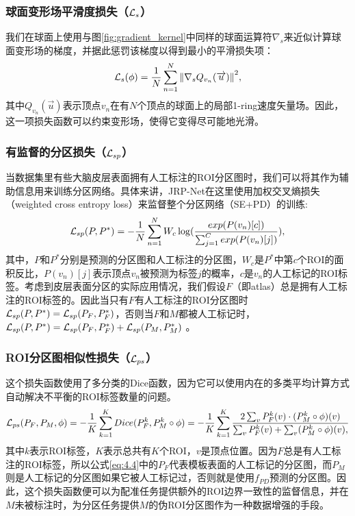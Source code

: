 \subsubsection{球面变形场平滑度损失（${\cal L}_s$）}
我们在球面上使用与图\ref{fig:gradient_kernel}中同样的球面运算符$\nabla_s$来近似计算球面变形场的梯度，并据此惩罚该梯度以得到最小的平滑损失项：
\begin{equation}\label{eq:4.2}
{\cal L}_{s}(\phi)=\frac{1}{N}\sum_{n=1}^{N} {\| \nabla_s Q_{v_n}(\overrightarrow{u}) \|}^2,
\end{equation}
其中$Q_{v_n}(\overrightarrow{u})$表示顶点$v_n$在有$N$个顶点的球面上的局部1-ring速度矢量场。因此，这一项损失函数可以约束变形场，使得它变得尽可能地光滑。

\subsubsection{有监督的分区损失（${\cal L}_{sp}$）}
当数据集里有些大脑皮层表面拥有人工标注的ROI分区图时，我们可以将其作为辅助信息用来训练分区网络。具体来讲，JRP-Net在这里使用加权交叉熵损失（weighted cross entropy loss）来监督整个分区网络（SE+PD）的训练:
\begin{equation}\label{eq:4.3}
{\cal L}_{sp}(P, P^*)=-\frac{1}{N}\sum_{n=1}^{N}W_c \log(\frac{exp(P(v_n)[c])}{\sum_{j=1}^{C}exp(P(v_n)[j])}),
\end{equation}
其中，$P$和$P^*$分别是预测的分区图和人工标注的分区图，$W_c$是$P^*$中第$c$个ROI的面积反比，$P(v_n )[j]$表示顶点$v_n$被预测为标签$j$的概率，$c$是$v_n$的人工标记的ROI标签。考虑到皮层表面分区的实际应用情况，我们假设$F$（即atlas）总是拥有人工标注的ROI标签的。因此当只有$F$有人工标注的ROI分区图时${\cal L}_{sp}(P,P^*)={\cal L}_{sp}(P_F,P_F^* )$，否则当$F$和$M$都被人工标记时，${\cal L}_{sp}(P,P^* )={\cal L}_{sp} (P_F,P_F^*)+{\cal L}_{sp}(P_M,P_M^*)$ 。

\subsubsection{ROI分区图相似性损失（${\cal L}_{ps}$）}
这个损失函数使用了多分类的Dice函数，因为它可以使用内在的多类平均计算方式自动解决不平衡的ROI标签数量的问题\cite{xu2019deepatlas}。
\begin{equation}\label{eq:4.4}
{\cal L}_{ps}(P_F,P_M,\phi)=-\frac{1}{K}\sum_{k=1}^{K}Dice(P_F^k,P_M^k\circ \phi)=-\frac{1}{K}\sum_{k=1}^{K}\frac{2\sum_{v}P_F^k(v)\cdot (P_M^k\circ \phi)(v)}{\sum_{v}P_F^k(v)+\sum_{v}(P_M^k\circ \phi)(v),}
\end{equation}
其中$k$表示ROI标签，$K$表示总共有$K$个ROI，$v$是顶点位置。因为$F$总是有人工标注的ROI标签，所以公式\ref{eq:4.4}中的$P_F$代表模板表面的人工标记的分区图，而$P_M$则是人工标记的分区图如果它被人工标记过，否则就是使用$f_{PD}$预测的分区图。因此，这个损失函数便可以为配准任务提供额外的ROI边界一致性的监督信息，并在$M$未被标注时，为分区任务提供$M$的伪ROI分区图作为一种数据增强的手段。

